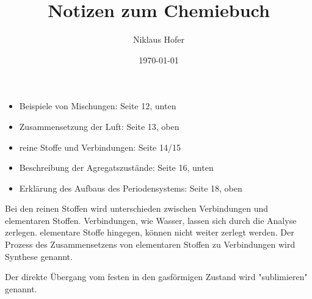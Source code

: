 \documentclass[11pt,paper=a4,final]{scrartcl}
\title{Notizen zum Chemiebuch}
\author{Niklaus Hofer}
\date{\today{}}
\begin{document}
\maketitle

\begin{itemize}
  \item Beispiele von Mischungen: Seite 12, unten
  \item Zusammensetzung der Luft: Seite 13, oben
  \item reine Stoffe und Verbindungen: Seite 14/15
  \item Beschreibung der Agregatszust\"ande: Seite 16, unten
  \item Erkl\"arung des Aufbaus des Periodensystems: Seite 18, oben
\end{itemize}

Bei den reinen Stoffen wird unterschieden zwischen Verbindungen und elementaren Stoffen. Verbindungen, wie Wasser, lassen sich durch die Analyse zerlegen. elementare Stoffe hingegen, k\"onnen nicht weiter zerlegt werden. Der Prozess des Zusammensetzens von elementaren Stoffen zu Verbindungen wird Synthese genannt. 

Der direkte \"Ubergang vom festen in den gasf\"ormigen Zustand wird "sublimieren" genannt.
\end{document}
